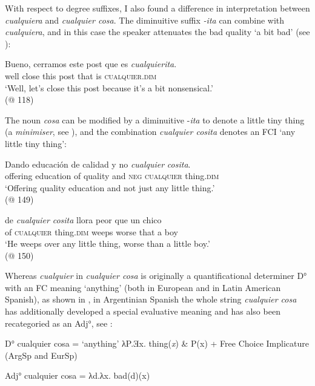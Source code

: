 With respect to degree suffixes, I also found a difference in interpretation between \textit{cualquiera} and \textit{cualquier cosa}. The diminuitive suffix \textit{-ita} can combine with \textit{cualquiera}, and in this case the speaker attenuates the bad quality ‘a bit bad’ (see ):

\ea \label{ex:key:264} %
    \gll Bueno, cerramos este post que {es} \textit{cualquierita}.\\
    well close this post that is \textsc{cualquier}.\textsc{dim}\\
    \glt ‘Well, let’s close this post because it’s a bit nonsensical.’\\
    (@ 118)
\z

The noun \textit{cosa} can be modified by a diminuitive -\textit{ita} to denote a little tiny thing (a \textit{minimiser}, see \citealt{Krifka1995}), and the combination \textit{cualquier cosita} denotes an FCI ‘any little tiny thing’:

\ea \label{ex:key:265} %
    \gll Dando educación de calidad y no \textit{cualquier} \textit{cosita}.\\
    offering education of quality and \textsc{neg} \textsc{cualquier} thing.\textsc{dim}\\
    \glt ‘Offering quality education and not just any little thing.’\\
    (@ 149)
\z

\ea \label{ex:key:266} %
    \gll de \textit{cualquier} \textit{cosita} llora peor que un chico\\
    of \textsc{cualquier} thing.\textsc{dim} weeps worse that a boy\\
    \glt ‘He weeps over any little thing, worse than a little boy.’\\
    (@ 150)
\z

Whereas \textit{cualquier} in \textit{cualquier cosa} is originally a quantificational determiner D° with an FC meaning ‘anything’ (both in European and in Latin American Spanish), as shown in , in Argentinian Spanish the whole string \textit{cualquier cosa} has additionally developed a special evaluative meaning and has also been recategoried as an Adj°, see :

\ea \label{bkm:Ref150787837} %
\ea 
D° cualquier cosa = ‘anything’ 
\ex λP.Ǝx. thing(\textit{x}) \& P(x) + Free Choice Implicature
(ArgSp and EurSp)
\z 
\z

\ea \label{bkm:Ref150787813}   %
Adj° cualquier cosa = λd.λx. bad(d)(x)


